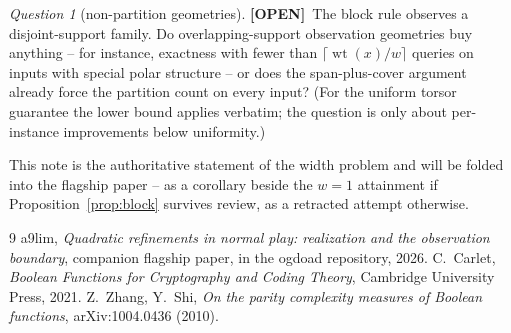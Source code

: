 \documentclass[11pt]{article}
\theoremstyle{definition}
\theoremstyle{remark}
\newtheorem{question}[theorem]{Question}
\newcommand{\wt}{\operatorname{wt}}
\newcommand{\taglabel}[1]{\textnormal{\textbf{[#1]}}}
\newcommand{\OPEN}{\taglabel{OPEN}}
\begin{document}
\begin{question}[non-partition geometries]\label{q:geometry}
\OPEN\ The block rule observes a disjoint-support family.  Do
overlapping-support observation geometries buy anything -- for instance,
exactness with fewer than $\lceil\wt(x)/w\rceil$ queries on inputs with
special polar structure -- or does the span-plus-cover argument already
force the partition count on every input?  (For the uniform torsor
guarantee the lower bound applies verbatim; the question is only about
per-instance improvements below uniformity.)
\end{question}

This note is the authoritative statement of the width problem and will
be folded into the flagship paper -- as a corollary beside the $w=1$
attainment if Proposition~\ref{prop:block} survives review, as a
retracted attempt otherwise.

\begin{thebibliography}{9}\footnotesize
{} a9lim, \emph{Quadratic refinements in normal play:
realization and the observation boundary}, companion flagship paper,
 in the ogdoad repository, 2026.
 C.~Carlet, \emph{Boolean Functions for Cryptography
and Coding Theory}, Cambridge University Press, 2021.
 Z.~Zhang, Y.~Shi, \emph{On the parity complexity
measures of Boolean functions}, arXiv:1004.0436 (2010).
\end{thebibliography}
\end{document}
